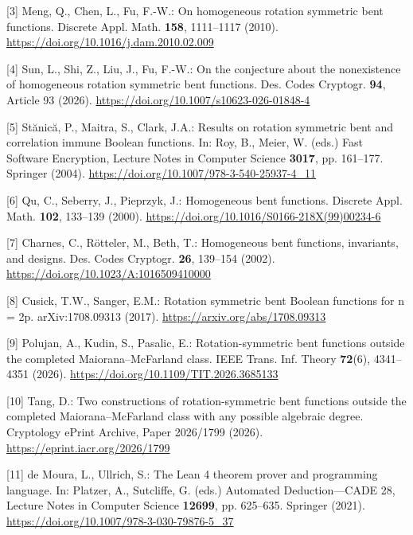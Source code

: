 \documentclass[11pt,a4paper]{article}
\begin{document}
[3] Meng, Q., Chen, L., Fu, F.-W.: On homogeneous rotation symmetric bent functions. Discrete Appl. Math. \textbf{158}, 1111--1117 (2010). \url{https://doi.org/10.1016/j.dam.2010.02.009}

[4] Sun, L., Shi, Z., Liu, J., Fu, F.-W.: On the conjecture about the nonexistence of homogeneous rotation symmetric bent functions. Des. Codes Cryptogr. \textbf{94}, Article 93 (2026). \url{https://doi.org/10.1007/s10623-026-01848-4}

[5] St\u{a}nic\u{a}, P., Maitra, S., Clark, J.A.: Results on rotation symmetric bent and correlation immune Boolean functions. In: Roy, B., Meier, W. (eds.) Fast Software Encryption, Lecture Notes in Computer Science \textbf{3017}, pp. 161--177. Springer (2004). \url{https://doi.org/10.1007/978-3-540-25937-4_11}

[6] Qu, C., Seberry, J., Pieprzyk, J.: Homogeneous bent functions. Discrete Appl. Math. \textbf{102}, 133--139 (2000). \url{https://doi.org/10.1016/S0166-218X(99)00234-6}

[7] Charnes, C., Rötteler, M., Beth, T.: Homogeneous bent functions, invariants, and designs. Des. Codes Cryptogr. \textbf{26}, 139--154 (2002). \url{https://doi.org/10.1023/A:1016509410000}

[8] Cusick, T.W., Sanger, E.M.: Rotation symmetric bent Boolean functions for n = 2p. arXiv:1708.09313 (2017). \url{https://arxiv.org/abs/1708.09313}

[9] Polujan, A., Kudin, S., Pasalic, E.: Rotation-symmetric bent functions outside the completed Maiorana--McFarland class. IEEE Trans. Inf. Theory \textbf{72}(6), 4341--4351 (2026). \url{https://doi.org/10.1109/TIT.2026.3685133}

[10] Tang, D.: Two constructions of rotation-symmetric bent functions outside the completed Maiorana--McFarland class with any possible algebraic degree. Cryptology ePrint Archive, Paper 2026/1799 (2026). \url{https://eprint.iacr.org/2026/1799}

[11] de Moura, L., Ullrich, S.: The Lean 4 theorem prover and programming language. In: Platzer, A., Sutcliffe, G. (eds.) Automated Deduction---CADE 28, Lecture Notes in Computer Science \textbf{12699}, pp. 625--635. Springer (2021). \url{https://doi.org/10.1007/978-3-030-79876-5_37}
\end{document}

